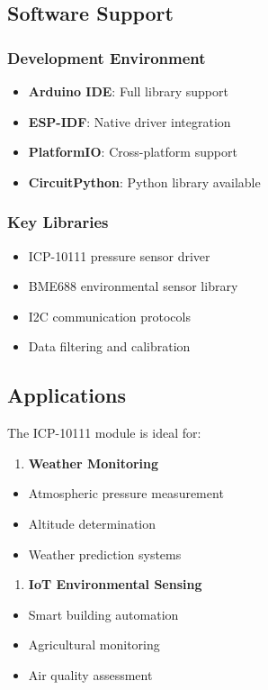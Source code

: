 \documentclass[11pt,a4paper]{article}
\begin{document}
\subsection{Software Support}

\subsubsection{Development Environment}
\begin{itemize}
\item \textbf{Arduino IDE}: Full library support
\item \textbf{ESP-IDF}: Native driver integration
\item \textbf{PlatformIO}: Cross-platform support
\item \textbf{CircuitPython}: Python library available
\end{itemize}

\subsubsection{Key Libraries}
\begin{itemize}
\item ICP-10111 pressure sensor driver
\item BME688 environmental sensor library
\item I2C communication protocols
\item Data filtering and calibration
\end{itemize}

\subsection{Applications}

The ICP-10111 module is ideal for:

\begin{enumerate}
\item \textbf{Weather Monitoring}
\end{enumerate}
\begin{itemize}
\item Atmospheric pressure measurement
\item Altitude determination
\item Weather prediction systems
\end{itemize}

\begin{enumerate}
\item \textbf{IoT Environmental Sensing}
\end{enumerate}
\begin{itemize}
\item Smart building automation
\item Agricultural monitoring
\item Air quality assessment
\end{itemize}
\end{document}
